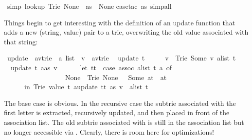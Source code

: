 \begin{isabellebody}
\begin{isamarkuptext}
\end{isamarkuptext}%
\isamarkuptrue%
\ {\isacharbrackleft}simp{\isacharbrackright}{\isacharcolon}\ {\isachardoublequote}lookup\ {\isacharparenleft}Trie\ None\ {\isacharbrackleft}{\isacharbrackright}{\isacharparenright}\ as\ {\isacharequal}\ None{\isachardoublequote}\isanewline
\isamarkupfalse%
case{\isacharunderscore}tac\ as{\isacharcomma}\ simp{\isacharunderscore}all{\isacharparenright}\isanewline
\isamarkupfalse%
\isamarkupfalse%
%
\begin{isamarkuptext}%
Things begin to get interesting with the definition of an update function
that adds a new (string, value) pair to a trie, overwriting the old value
associated with that string:%
\end{isamarkuptext}%
\isamarkuptrue%
\ update\ {\isacharcolon}{\isacharcolon}\ {\isachardoublequote}{\isacharparenleft}{\isacharprime}a{\isacharcomma}{\isacharprime}v{\isacharparenright}trie\ {\isasymRightarrow}\ {\isacharprime}a\ list\ {\isasymRightarrow}\ {\isacharprime}v\ {\isasymRightarrow}\ {\isacharparenleft}{\isacharprime}a{\isacharcomma}{\isacharprime}v{\isacharparenright}trie{\isachardoublequote}\isanewline
\isamarkupfalse%
\isanewline
\ \ {\isachardoublequote}update\ t\ {\isacharbrackleft}{\isacharbrackright}\ \ \ \ \ v\ {\isacharequal}\ Trie\ {\isacharparenleft}Some\ v{\isacharparenright}\ {\isacharparenleft}alist\ t{\isacharparenright}{\isachardoublequote}\isanewline
\ \ {\isachardoublequote}update\ t\ {\isacharparenleft}a{\isacharhash}as{\isacharparenright}\ v\ {\isacharequal}\isanewline
\ \ \ \ \ {\isacharparenleft}let\ tt\ {\isacharequal}\ {\isacharparenleft}case\ assoc\ {\isacharparenleft}alist\ t{\isacharparenright}\ a\ of\isanewline
\ \ \ \ \ \ \ \ \ \ \ \ \ \ \ \ \ \ None\ {\isasymRightarrow}\ Trie\ None\ {\isacharbrackleft}{\isacharbrackright}\ {\isacharbar}\ Some\ at\ {\isasymRightarrow}\ at{\isacharparenright}\isanewline
\ \ \ \ \ \ in\ Trie\ {\isacharparenleft}value\ t{\isacharparenright}\ {\isacharparenleft}{\isacharparenleft}a{\isacharcomma}update\ tt\ as\ v{\isacharparenright}\ {\isacharhash}\ alist\ t{\isacharparenright}{\isacharparenright}{\isachardoublequote}\isamarkupfalse%
%
\begin{isamarkuptext}%
\noindent
The base case is obvious. In the recursive case the subtrie
 associated with the first letter  is extracted,
recursively updated, and then placed in front of the association list.
The old subtrie associated with  is still in the association list
but no longer accessible via . Clearly, there is room here for
optimizations!


\end{isamarkuptext}
\end{isabellebody}
